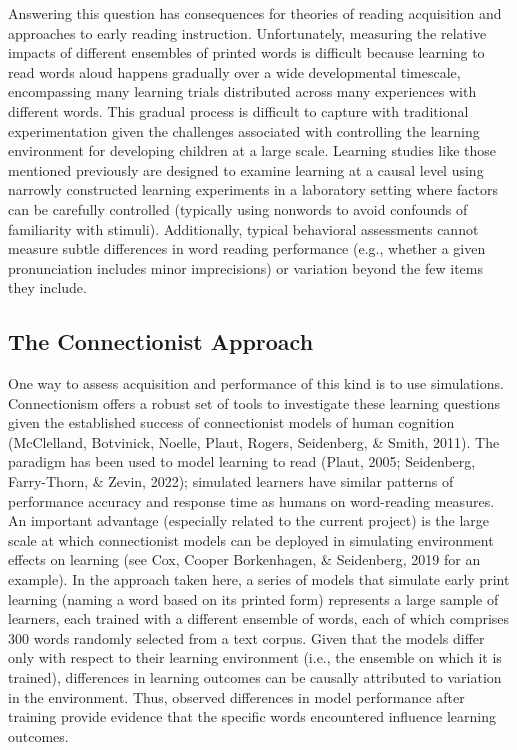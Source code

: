 \documentclass[
  ,man,floatsintext]{apa6}
\begin{document}
Answering this question has consequences for theories of reading acquisition and approaches to early reading instruction. Unfortunately, measuring the relative impacts of different ensembles of printed words is difficult because learning to read words aloud happens gradually over a wide developmental timescale, encompassing many learning trials distributed across many experiences with different words. This gradual process is difficult to capture with traditional experimentation given the challenges associated with controlling the learning environment for developing children at a large scale. Learning studies like those mentioned previously are designed to examine learning at a causal level using narrowly constructed learning experiments in a laboratory setting where factors can be carefully controlled (typically using nonwords to avoid confounds of familiarity with stimuli). Additionally, typical behavioral assessments cannot measure subtle differences in word reading performance (e.g., whether a given pronunciation includes minor imprecisions) or variation beyond the few items they include.

\hypertarget{the-connectionist-approach}{%
\subsection{The Connectionist Approach}\label{the-connectionist-approach}}

One way to assess acquisition and performance of this kind is to use simulations. Connectionism offers a robust set of tools to investigate these learning questions given the established success of connectionist models of human cognition (McClelland, Botvinick, Noelle, Plaut, Rogers, Seidenberg, \& Smith, 2011). The paradigm has been used to model learning to read (Plaut, 2005; Seidenberg, Farry-Thorn, \& Zevin, 2022); simulated learners have similar patterns of performance accuracy and response time as humans on word-reading measures. An important advantage (especially related to the current project) is the large scale at which connectionist models can be deployed in simulating environment effects on learning (see Cox, Cooper Borkenhagen, \& Seidenberg, 2019 for an example). In the approach taken here, a series of models that simulate early print learning (naming a word based on its printed form) represents a large sample of learners, each trained with a different ensemble of words, each of which comprises 300 words randomly selected from a text corpus. Given that the models differ only with respect to their learning environment (i.e., the ensemble on which it is trained), differences in learning outcomes can be causally attributed to variation in the environment. Thus, observed differences in model performance after training provide evidence that the specific words encountered influence learning outcomes.
\end{document}
